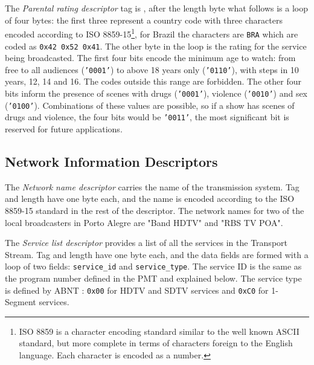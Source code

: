 \documentclass[
	12pt,				%
	openright,			%
	twoside,			%
	a4paper,			%
	brazil,
	french,				%
	english
	]{abntex2}
\begin{document}
The \textit{Parental rating descriptor} tag is \texttt{}, after the length byte what follows is a loop of four bytes: the first three represent a country code with three characters encoded according to ISO 8859-15\footnote{ISO 8859 is a character encoding standard similar to the well known ASCII standard, but more complete in terms of characters foreign to the English language. Each character is encoded as a number.}, for Brazil the characters are \texttt{BRA} which are coded as \texttt{0x42 0x52 0x41}. The other byte in the loop is the rating for the service being broadcasted. The first four bits encode the minimum age to watch: from free to all audiences (\texttt{'0001'}) to above 18 years only (\texttt{'0110'}), with steps in 10 years, 12, 14 and 16. The codes outside this range are forbidden. The other four bits inform the presence of scenes with drugs (\texttt{'0001'}), violence (\texttt{'0010'}) and sex (\texttt{'0100'}). Combinations of these values are possible, so if a show has scenes of drugs and violence, the four bits would be \texttt{'0011'}, the most significant bit is reserved for future applications.

\subsection{Network Information Descriptors}
\label{nit_descriptors}
The \textit{Network name descriptor} carries the name of the transmission system. Tag and length have one byte each, and the name is encoded according to the ISO 8859-15 standard in the rest of the descriptor. The network names for two of the local broadcasters in Porto Alegre are "Band HDTV" and "RBS TV POA".

The \textit{Service list descriptor} provides a list of all the services in the Transport Stream. Tag and length have one byte each, and the data fields are formed with a loop of two fields: \texttt{service\hspace{0.1mm}\_\hspace{0.1mm}id} and \texttt{service\hspace{0.1mm}\_\hspace{0.1mm}type}. The service ID is the same as the program number defined in the PMT and explained below. The service type is defined by ABNT : \texttt{0x00} for HDTV and SDTV services and \texttt{0xC0} for 1-Segment services.
\end{document}
